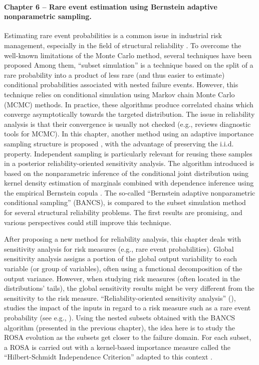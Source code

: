 \paragraph{Chapter 6 -- Rare event estimation using Bernstein adaptive nonparametric sampling.} 
Estimating rare event probabilities is a common issue in industrial risk management, especially in the field of structural reliability \citep{MorioBalesdent2015}. 
To overcome the well-known limitations of the Monte Carlo method, several techniques have been proposed
Among them, ``subset simulation'' \citep{AuBeck2001} is a technique based on the split of a rare probability into a product of less rare (and thus easier to estimate) conditional probabilities associated with nested failure events. 
However, this technique relies on conditional simulation using Markov chain Monte Carlo (MCMC) methods. 
In practice, these algorithms produce correlated chains which converge asymptotically towards the targeted distribution. 
The issue in reliability analysis is that their convergence is usually not checked (e.g., \citealp{roy_2020_mcmc_convergence} reviews diagnostic tools for MCMC).    
In this chapter, another method using an adaptive importance sampling structure is proposed \citep{zhang_1996_NIS}, with the advantage of preserving the i.i.d. property. 
Independent sampling is particularly relevant for reusing these samples in a posterior reliability-oriented sensitivity analysis. 
The algorithm introduced is based on the nonparametric inference of the conditional joint distribution using kernel density estimation of marginals combined with dependence inference using the empirical Bernstein copula \citep{sancetta_satchell_2004}. 
The so-called ``Bernstein adaptive nonparametric conditional sampling'' (BANCS), is compared to the subset simulation method for several structural reliability problems. 
The first results are promising, and various perspectives could still improve this technique.

After proposing a new method for reliability analysis, this chapter deals with sensitivity analysis for risk measures (e.g., rare event probabilities). 
Global sensitivity analysis \citep{daveiga_iooss_2021} assigns a portion of the global output variability to each variable (or group of variables), often using a functional decomposition of the output variance. 
However, when studying risk measures (often located in the distributions' tails), the global sensitivity results might be very different from the sensitivity to the risk measure. 
``Reliability-oriented sensitivity analysis'' (), studies the impact of the inputs in regard to a risk measure such as a rare event probability (see e.g., \citealp{chabridon_2018_thesis}). 
Using the nested subsets obtained with the BANCS algorithm (presented in the previous chapter), the idea here is to study the ROSA evolution as the subsets get closer to the failure domain. 
For each subset, a ROSA is carried out with a kernel-based importance measure called the ``Hilbert-Schmidt Independence Criterion'' adapted to this context \citep{daveiga_2015,marrel_chabridon_2021}. 

